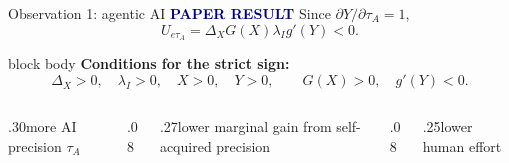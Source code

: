 \documentclass[aspectratio=169,10pt]{beamer}
\newcommand{\paperlabel}{\textcolor{Navy}{\scriptsize\bfseries PAPER RESULT}}
\begin{document}
\begin{frame}{Observation 1: agentic AI}
  \paperlabel
  \vspace{.15cm}
  Since $\partial Y/\partial\tau_A=1$,
  \[
    \boxed{U_{e\tau_A}=\Delta_XG(X)\lambda_Ig'(Y)<0.}
  \]

  \vspace{.25cm}
  \begin{beamercolorbox}[rounded=true,sep=.75em]{block body}
    \textbf{Conditions for the strict sign:}
    \[
      \Delta_X>0,\quad \lambda_I>0,\quad X>0,\quad Y>0,
      \qquad G(X)>0,\quad g'(Y)<0.
    \]
  \end{beamercolorbox}

  \vspace{.35cm}
  \begin{columns}[c,onlytextwidth]
    \begin{column}{.30\textwidth}\centering more AI precision $\tau_A$\end{column}
    \begin{column}{.08\textwidth}\centering{\color{Gold}\Large$\Longrightarrow$}\end{column}
    \begin{column}{.27\textwidth}\centering lower marginal gain from self-acquired precision\end{column}
    \begin{column}{.08\textwidth}\centering{\color{Gold}\Large$\Longrightarrow$}\end{column}
    \begin{column}{.25\textwidth}\centering lower human effort\end{column}
  \end{columns}
\end{frame}
\end{document}
